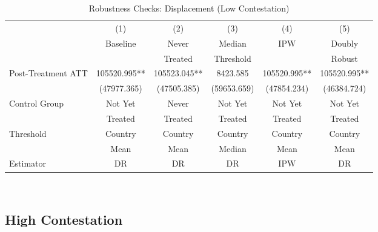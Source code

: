 \documentclass[bibtex]{article}
\begin{document}
{\begin{table}[H]
\centering
\caption{Robustness Checks: Displacement (Low Contestation)}
\label{tab:robust_idp_low}
\begin{tabular}{lccccc}
\toprule
 & (1) & (2) & (3) & (4) & (5) \\
 & Baseline & Never & Median & IPW & Doubly \\
 &  & Treated & Threshold &  & Robust \\
\midrule
Post-Treatment ATT & 105520.995** & 105523.045** & 8423.585 & 105520.995** & 105520.995** \\
 & (47977.365) & (47505.385) & (59653.659) & (47854.234) & (46384.724) \\
\midrule
Control Group & Not Yet & Never & Not Yet & Not Yet & Not Yet \\
 & Treated & Treated & Treated & Treated & Treated \\
Threshold & Country & Country & Country & Country & Country \\
 & Mean & Mean & Median & Mean & Mean \\
Estimator & DR & DR & DR & IPW & DR \\
\bottomrule
\end{tabular}\\
\end{table}


\subsection{High Contestation}

}
\end{document}
